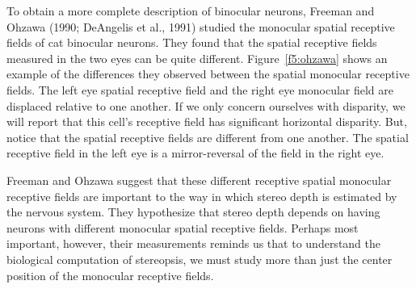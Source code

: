 To obtain a more complete description of binocular neurons,
Freeman and Ohzawa (1990;  DeAngelis et al., 1991) studied the monocular
spatial receptive fields of cat binocular neurons.
They found that the spatial receptive fields
measured in the two eyes can be quite different.
Figure~\ref{f5:ohzawa} shows
an example of the differences they observed
between the spatial monocular receptive fields.
The left eye spatial receptive field and the right eye
monocular field are displaced relative to one another.
If we only concern ourselves with disparity, we will
report that this cell's receptive
field has significant horizontal disparity.
But, notice that the spatial receptive fields are different
from one another.
The spatial receptive field in the left eye is a mirror-reversal
of the field in the right eye.

Freeman and Ohzawa suggest that these  different
receptive spatial monocular receptive fields are important to the
way in which stereo depth is estimated by the nervous system.
They hypothesize that stereo depth depends on having neurons
with different monocular spatial receptive fields.
Perhaps most important, however, their measurements
reminds us that to understand the biological computation
of stereopsis, we must study more than just
the center position of the monocular receptive fields.
